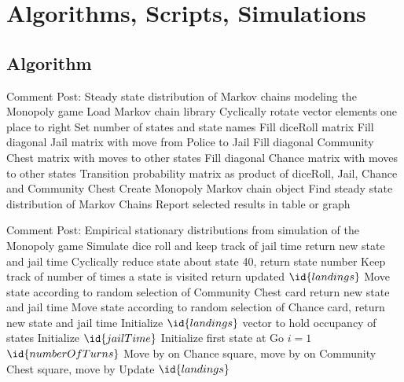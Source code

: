 \documentclass[12pt]{article}
\begin{document}
\section*{Algorithms, Scripts, Simulations}

\subsection*{Algorithm}
\begin{codebox}
  \zi Comment Post:  Steady state distribution
  \zi of Markov chains modeling the Monopoly game
  \li Load Markov chain library
  \li {}
  \li Cyclically rotate vector elements one place to right
  \zi
  \li Set number of states and state names
  \zi
  \li Fill diceRoll matrix
  \zi
  \li Fill diagonal Jail matrix with move from Police to Jail
  \zi
  \li Fill diagonal Community Chest matrix with moves to other states
  \zi
  \li Fill diagonal Chance matrix with moves to other states
  \zi
  \li Transition probability matrix as product of
  \zi diceRoll, Jail, Chance and Community Chest
  \li Create Monopoly Markov chain object
  \li Find steady state distribution of Markov Chains
  \li Report selected results in table or graph 
\end{codebox}

\begin{codebox}
  \zi Comment Post: Empirical stationary distributions
  \zi from simulation of the Monopoly game
  \li {}
  \li Simulate dice roll and
  \li keep track of jail time
  \li return new state and jail time
  \zi
  \li {}
  \li Cyclically reduce state about state 40,
  \li return state number
  \zi
  \li {}
  \li Keep track of number of times a state is visited
  \li return updated $\id{landings}$
  \zi
  \li {}
  \li Move state according to random selection
  \li of Community Chest card
  \li return new state and jail time
  \zi
  \li {}
  \li Move state according to random selection
  \li of Chance card,
  \li return new state and jail time
  \zi
  \li {}
  \li Initialize $\id{landings}$ vector to hold occupancy of states
  \li Initialize $\id{jailTime}$
  \li Initialize first state at Go
  \li \For $i = 1$ \To $\id{numberOfTurns}$
  \li         Move by 
  \li         \If on Chance square, move by 
  \li         \If on Community Chest square, move by 
  \li            Update  $\id{landings}$
\end{codebox}
\end{document}
